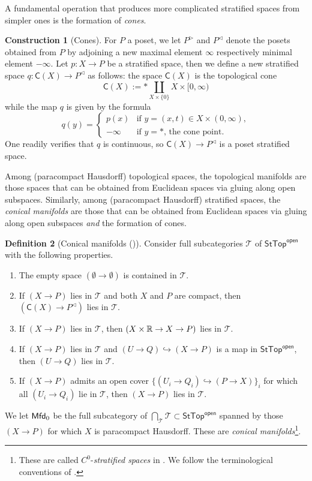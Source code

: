 \documentclass[10pt, reqno, twoside
, final
]{amsart}
\numberwithin{equation}{subsection}%
\theoremstyle{definition}
\newtheorem{defn}{Definition}[subsection]
\theoremstyle{definition}
\theoremstyle{definition}
\theoremstyle{definition}
\newtheorem{cons}[defn]{Construction}
\theoremstyle{definition}
\theoremstyle{definition}
\theoremstyle{definition}
\theoremstyle{definition}
\theoremstyle{definition}
\theoremstyle{plain}
\theoremstyle{definition}
\theoremstyle{plain}
\theoremstyle{definition}
\theoremstyle{plain}
\theoremstyle{definition}
\theoremstyle{definition}
\theoremstyle{plain}
\theoremstyle{plain}
\theoremstyle{definition}
\theoremstyle{plain}
\theoremstyle{plain}
\theoremstyle{plain}
\begin{document}
A fundamental operation that produces more complicated stratified spaces from simpler ones is the formation of \emph{cones}.
\begin{cons}[Cones]
For $P$ a poset, we let $P^{\rhd}$ and $P^{\lhd}$ denote the posets obtained from $P$ by adjoining a new maximal element $\infty$ respectively minimal element $-\infty$. Let $p:X\rightarrow P$ be a stratified space, then we define a new stratified space $q:\mathsf{C}(X)\rightarrow P^{\lhd}$ as follows: the space $\mathsf{C}(X)$ is the topological cone
\[  \mathsf{C}(X):= * \coprod_{X\times \{0\}}  X\times [0,\infty)  \]
while the map $q$ is given by the formula
\[
q(y) = \begin{cases}
   p(x)& \text{if } y=(x,t)\in X\times (0,\infty), \\
    -\infty & \text{if $y=*$, the cone point}.  
\end{cases}
\]
One readily verifies that $q$ is continuous, so $\mathsf{C}(X)\rightarrow P^{\lhd}$ is a poset stratified space.
\end{cons}
Among (paracompact Hausdorff) topological spaces, the topological manifolds are those spaces that can be obtained from Euclidean spaces via gluing along open subspaces. Similarly, among (paracompact Hausdorff) stratified spaces, the \emph{conical manifolds} are those that can be obtained from Euclidean spaces via gluing along open subspaces \emph{and} the formation of cones. 
\begin{defn}[Conical manifolds (\cite{AFT-local-structures})]\label{defn:conmfd}
Consider full subcategories $\mathcal{T}$ of $\mathsf{StTop}^{\mathsf{open}}$ with the following properties. 
\begin{enumerate}[$(1)$]
    \item The empty space $(\emptyset\rightarrow \emptyset)$ is contained in $\mathcal{T}$.
    \item If $(X\rightarrow P)$ lies in $\mathcal{T}$ and both $X$ and $P$ are compact, then $(\mathsf{C}(X)\rightarrow P^{\lhd})$ lies in $\mathcal{T}$.
    \item If $(X\rightarrow P)$ lies in $\mathcal{T}$, then $(X\times \mathbb{R}\rightarrow X\rightarrow P)$ lies in $\mathcal{T}$.
    \item If $(X\rightarrow P)$ lies in $\mathcal{T}$ and $(U\rightarrow Q)\hookrightarrow (X\rightarrow P)$ is a map in $\mathsf{StTop}^{\mathsf{open}}$, then $(U\rightarrow Q)$ lies in $\mathcal{T}$.
    \item If $(X\rightarrow P)$ admits an open cover $\{(U_i\rightarrow Q_i)\hookrightarrow (P\rightarrow X)\}_i$ for which all $(U_i\rightarrow Q_i)$ lie in $\mathcal{T}$, then $(X\rightarrow P)$ lies in $\mathcal{T}$.
\end{enumerate}
We let $\mathsf{Mfd}_0$ be the full subcategory of $\bigcap_{\mathcal{T}}\mathcal{T}\subset \mathsf{StTop}^{\mathsf{open}}$ spanned by those $(X\rightarrow P)$ for which $X$ is paracompact Hausdorff. These are \emph{conical manifolds}\footnote{These are called $C^0$-\emph{stratified spaces} in \cite{AFT-local-structures}. We follow the terminological conventions of \cite{KSW}.}.
\end{defn}
\end{document}
